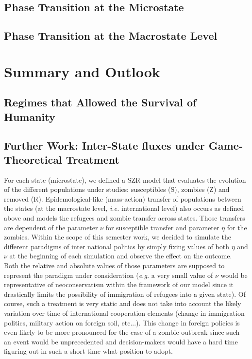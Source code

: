 \documentclass[11pt]{article} %
\begin{document}
\subsection{Phase Transition at the Microstate }\indent



\subsection{Phase Transition at the Macrostate Level}\indent


\newpage
\section{Summary and Outlook}\indent

\subsection{Regimes that Allowed the Survival of Humanity}\indent


\subsection{Further Work: Inter-State fluxes under Game-Theoretical Treatment}\indent

For each state (microstate), we defined a SZR model that evaluates the evolution of the different populations under studies: susceptibles (S), zombies (Z) and removed (R). Epidemological-like (mass-action) transfer of populations between the states (at the macrostate level, \textit{i.e.} international level) also occurs as defined above and models the refugees and zombie transfer across states. Those transfers are dependent of the parameter $\nu$ for susceptible transfer and parameter $\eta$ for the zombies. Within the scope of this semester work, we decided to simulate the different paradigms of inter national politics by simply fixing values of both $\eta$ and $\nu$ at the beginning of each simulation and observe the effect on the outcome. Both the relative and absolute values of those parameters are supposed to represent the paradigm under consideration (\textit{e.g.} a very small value of $\nu$ would be representative of neoconservatism within the framework of our model since it drastically limits the possibility of immigration of refugees into a given state). Of course, such a treatment is very static and does not take into account the likely variation over time of  international cooperation elements (change in immigration politics, military action on foreign soil, etc...). This change in foreign policies is even likely to be more pronounced for the case of a zombie outbreak since such an event would be unprecedented and decision-makers would have a hard time figuring out in such a short time what position to adopt. 
\end{document}
